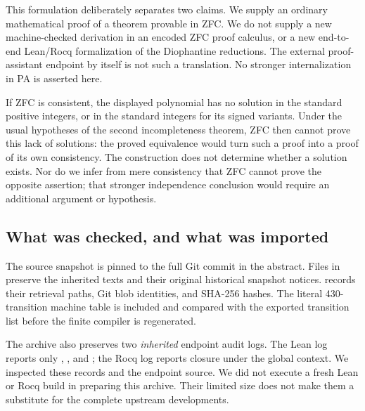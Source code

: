 This formulation deliberately separates two claims. We supply an ordinary
mathematical proof of a theorem provable in ZFC. We do not supply a new
machine-checked derivation in an encoded ZFC proof calculus, or a new
end-to-end Lean/Rocq formalization of the Diophantine reductions. The
external proof-assistant endpoint by itself is not such a translation.
No stronger internalization in PA is asserted here.

If ZFC is consistent, the displayed polynomial has no solution in the
standard positive integers, or in the standard integers for its signed
variants. Under the usual hypotheses of the second incompleteness theorem,
ZFC then cannot prove this lack of solutions: the proved equivalence would
turn such a proof into a proof of its own consistency. The construction
does not determine whether a solution exists. Nor do we infer from mere
consistency that ZFC cannot prove the opposite assertion; that stronger
independence conclusion would require an additional argument or hypothesis.

\subsection{What was checked, and what was imported}

The source snapshot is pinned to the full Git commit in the abstract.
Files in  preserve the inherited texts and their original
historical snapshot notices.  records their
retrieval paths, Git blob identities, and SHA-256 hashes. The literal
430-transition machine table is included and compared with the exported
transition list before the finite compiler is regenerated.

The archive also preserves two \emph{inherited} endpoint audit logs.
The Lean log reports only , , and
; the Rocq log reports closure under the global context.
We inspected these records and the endpoint source. We did not execute a
fresh Lean or Rocq build in preparing this archive. Their limited size
does not make them a substitute for the complete upstream developments.

